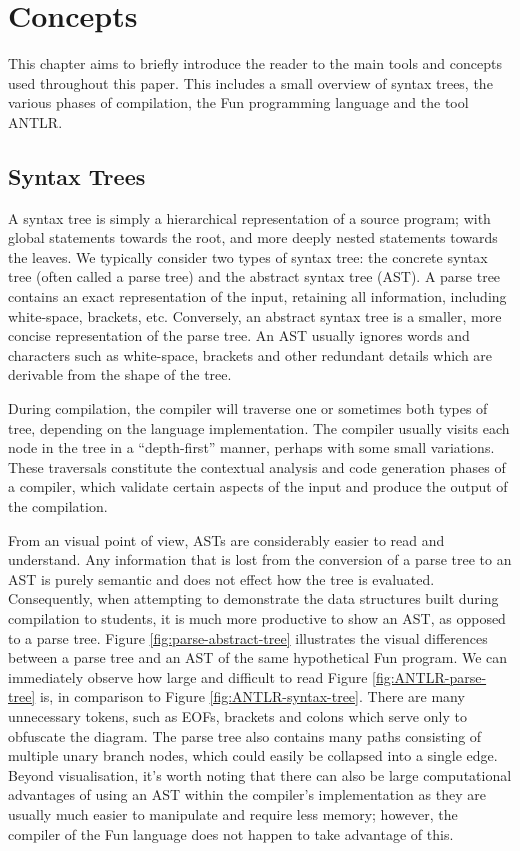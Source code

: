 \documentclass{l4proj}
\begin{document}
\chapter{Concepts}
This chapter aims to briefly introduce the reader to the main tools and concepts used throughout this paper. This includes a small overview of syntax trees, the various phases of compilation, the Fun programming language and the tool ANTLR.

\section{Syntax Trees}
A syntax tree is simply a hierarchical representation of a source program; with global statements towards the root, and more deeply nested statements towards the leaves. We typically consider two types of syntax tree: the concrete syntax tree (often called a parse tree) and the abstract syntax tree (AST). A parse tree contains an exact representation of the input, retaining all information, including white-space, brackets, etc. Conversely, an abstract syntax tree is a smaller, more concise representation of the parse tree. An AST usually ignores words and characters such as white-space, brackets and other redundant details which are derivable from the shape of the tree. 

During compilation, the compiler will traverse one or sometimes both types of tree, depending on the language implementation. The compiler usually visits each node in the tree in a ``depth-first'' manner, perhaps with some small variations. These traversals constitute the contextual analysis and code generation phases of a compiler, which validate certain aspects of the input and produce the output of the compilation. 

From an visual point of view, ASTs are considerably easier to read and understand. Any information that is lost from the conversion of a parse tree to an AST is purely semantic and does not effect how the tree is evaluated. Consequently, when attempting to demonstrate the data structures built during compilation to students, it is much more productive to show an AST, as opposed to a parse tree. Figure \ref{fig:parse-abstract-tree} illustrates the visual differences between a parse tree and an AST of the same hypothetical Fun program. We can immediately observe how large and difficult to read Figure \ref{fig:ANTLR-parse-tree} is, in comparison to Figure \ref{fig:ANTLR-syntax-tree}. There are many unnecessary tokens, such as EOFs, brackets and colons which serve only to obfuscate the diagram. The parse tree also contains many paths consisting of multiple unary branch nodes, which could easily be collapsed into a single edge. Beyond visualisation, it's worth noting that there can  also be large computational advantages of using an AST within the compiler's implementation as they are usually much easier to manipulate and require less memory; however, the compiler of the Fun language does not happen to take advantage of this. 
\end{document}
